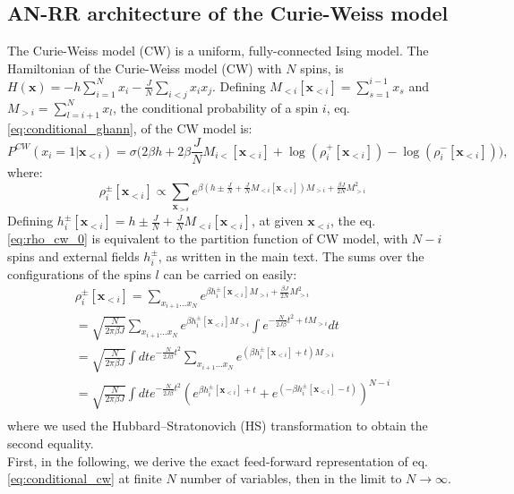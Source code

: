 \subsection{AN-RR architecture of the Curie-Weiss model}

The Curie-Weiss model (CW) is a uniform, fully-connected Ising model. The Hamiltonian of the Curie-Weiss model (CW) with $N$ spins, is $H\left(\mathbf{x}\right)=-h\sum_{i=1}^{N}x_{i}-\frac{J}{N}\sum_{i<j}x_{i}x_{j}$. Defining $M_{<i}[\mathbf{x}_{<i}]=\sum_{s=1}^{i-1}x_{s}$ and $M_{>i}=\sum_{l=i+1}^{N}x_{l}$, the conditional probability of a spin $i$, eq.\ref{eq:conditional_ghann}, of the CW model is:
\begin{equation}
P^{CW}\left(x_{i}=1|\mathbf{x}_{<i}\right) = 
\sigma\bigg( 
 2 \beta h + 2 \beta \frac{J}{N}M_{i<}[\mathbf{x}_{<i}] + %
 \log(\rho_i^+[\mathbf{x}_{<i}]) - \log(\rho_i^-[\mathbf{x}_{<i}])
\bigg),
\label{eq:conditional_cw}
\end{equation}
where:
\begin{equation}
\rho_i^{\pm}[\mathbf{x}_{<i}] \propto \sum_{\mathbf{x}_{>i}}e^{\beta \left(h\pm\frac{J}{N}+\frac{J}{N}M_{<i}[\mathbf{x}_{<i}]\right)M_{>i}+\frac{\beta J}{2N}M_{>i}^{2}} 
\label{eq:rho_cw_0}
\end{equation}
Defining $h_i^{\pm}[\mathbf{x}_{<i}] =h\pm\frac{J}{N}+\frac{J}{N}M_{<i}[\mathbf{x}_{<i}]$, at given $\mathbf{x}_{<i}$, the eq. \ref{eq:rho_cw_0} is equivalent to the partition function of CW model, with $N-i$ spins and external fields $h_i^{\pm}$, as written in the main text. 
The sums over the configurations of the spins $l$ can be carried on easily: 
\begin{multline}
 \rho_i^{\pm}[\mathbf{x}_{<i}] = \sum_{x_{i+1}\dots x_{N}} e^{\beta h_i^{\pm}[\mathbf{x}_{<i}]M_{>i} +\frac{\beta J}{2N}M_{>i}^{2}} \\
  = \sqrt{\frac{N}{2\pi \beta J}}\sum_{x_{i+1}\dots x_{N}}e^{\beta h_i^{\pm}[\mathbf{x}_{<i}] M_{>i}}\int e^{-\frac{N}{2J \beta}t^{2}+t M_{>i}} dt\\
  = \sqrt{\frac{N}{2\pi \beta J}}\int dt e^{-\frac{N}{2J \beta}t^{2}} \sum_{x_{i+1}\dots x_{N}}e^{(\beta h_i^{\pm}[\mathbf{x}_{<i}] + t) M_{>i}}  \\
 =  \sqrt{\frac{N}{2\pi \beta J}}\int dt e^{-\frac{N}{2J \beta}t^{2}} \left(e^{\beta h_i^{\pm}[\mathbf{x}_{<i}] + t} + e^{ (-\beta h_i^{\pm}[\mathbf{x}_{<i}] - t)} \right)^{N-i}  \\ 
 \label{eq:rho_last_exact}
 \end{multline} 
 where we used the Hubbard–Stratonovich (HS) transformation to obtain the second equality.\\
 First, in the following, we derive the exact feed-forward representation of eq.\ref{eq:conditional_cw} at finite $N$ number of variables, then in the limit to $N\rightarrow \infty$.\\

